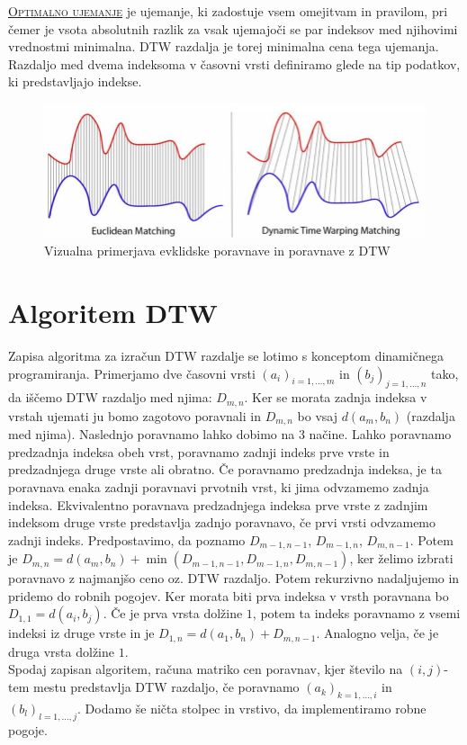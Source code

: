 \documentclass[12pt,a4paper]{article}
\begin{document}
\underline{\textsc{Optimalno ujemanje}} je ujemanje, ki zadostuje vsem omejitvam in pravilom, pri čemer je vsota absolutnih razlik za vsak ujemajoči
 se par indeksov med njihovimi vrednostmi minimalna. DTW razdalja je torej minimalna cena tega ujemanja. 
 Razdaljo med dvema indeksoma v časovni vrsti definiramo glede na tip podatkov, ki predstavljajo indekse.

 
\begin{figure}[h!]
    \centering
    \includegraphics[scale=0.40]{slike/dtw1.png}
    \caption{Vizualna primerjava evklidske poravnave in poravnave z DTW}
\end{figure}

\section{Algoritem DTW}
Zapisa algoritma za izračun DTW razdalje se lotimo s konceptom dinamičnega programiranja. 
Primerjamo dve časovni vrsti $(a_i)_{i=1, \dots, m}$ in $(b_j)_{j=1, \dots, n}$ tako, da iščemo DTW razdaljo med njima: $D_{m,n}$. 
Ker se morata zadnja indeksa v vrstah ujemati ju bomo zagotovo poravnali in $D_{m,n}$ bo vsaj $d(a_m, b_n)$ (razdalja med njima). 
Naslednjo poravnamo lahko dobimo na 3 načine. Lahko poravnamo predzadnja indeksa obeh vrst, poravnamo zadnji indeks prve vrste in predzadnjega druge vrste ali obratno.
Če poravnamo predzadnja indeksa, je ta poravnava enaka zadnji poravnavi prvotnih vrst, ki jima odvzamemo zadnja indeksa. 
Ekvivalentno poravnava predzadnjega indeksa prve vrste z zadnjim indeksom druge vrste predstavlja zadnjo poravnavo, če prvi vrsti odvzamemo zadnji indeks.
Predpostavimo, da poznamo $D_{m-1,n-1}$, $D_{m-1,n}$, $D_{m,n-1}$. 
Potem je $D_{m,n} = d(a_m, b_n) + \min(D_{m-1,n-1}, D_{m-1,n}, D_{m,n-1})$, ker želimo izbrati poravnavo z najmanjšo ceno oz. DTW razdaljo.
Potem rekurzivno nadaljujemo in pridemo do robnih pogojev. Ker morata biti prva indeksa v vrsth poravnana bo $D_{1,1} = d(a_i, b_j)$. Če je prva vrsta dolžine $1$, potem ta 
indeks poravnamo z vsemi indeksi iz druge vrste in je $D_{1,n} = d(a_1, b_n) +  D_{m,n-1}$. Analogno velja, če je druga vrsta dolžine $1$.
\\
Spodaj zapisan algoritem, računa matriko cen poravnav, kjer število na $(i,j)$-tem mestu predstavlja DTW razdaljo, 
če poravnamo $(a_k)_{k=1, \dots, i}$ in $(b_l)_{l=1, \dots, j}$. Dodamo še ničta stolpec in vrstivo, da implementiramo robne pogoje.\\
\end{document}
